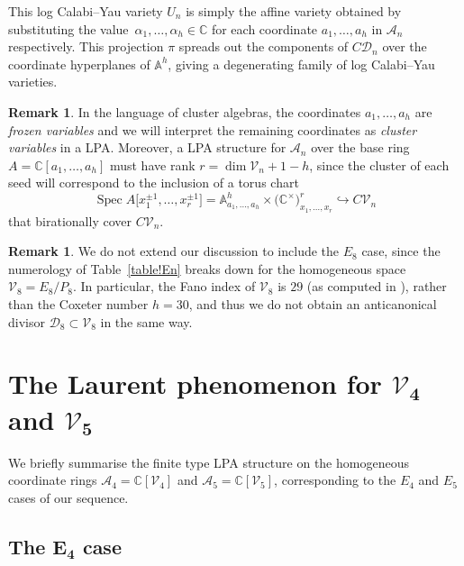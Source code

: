 \documentclass[10pt,a4paper]{amsart}
\numberwithin{equation}{section}
\theoremstyle{definition}
\newtheorem{rmk}[thm]{Remark}
\newcommand{\Aa}{\mathbb{A}}
\newcommand{\CC}{\mathbb{C}}
\DeclareMathOperator{\Spec}{Spec}
\begin{document}
This log Calabi--Yau variety $U_n$ is simply the affine variety obtained by substituting the value~${\alpha_1,\ldots,\alpha_h\in \CC}$ for each coordinate $a_1,\ldots,a_h$ in $\mathcal A_n$ respectively.
This projection $\pi$ spreads out the components of $C\mathcal D_n$ over the coordinate hyperplanes of $\Aa^h$, giving a degenerating family of log Calabi--Yau varieties.

\begin{rmk}\label{rmk!seed-rank}In the language of cluster algebras, the coordinates $a_1,\ldots,a_h$ are \emph{frozen variables} and we will interpret the remaining coordinates as \emph{cluster variables} in a LPA. Moreover, a LPA structure for $\mathcal A_n$ over the base ring $A=\CC[a_1,\ldots,a_h]$ must have rank $r = \dim \mathcal V_n + 1 - h$, since the cluster of each seed will correspond to the inclusion of a torus chart
\[ \Spec A\big[x_1^{\pm1},\ldots,x_r^{\pm1}\big] = \Aa^h_{a_1,\ldots,a_h}\times \big(\CC^\times\big)^r_{x_1,\ldots,x_r} \hookrightarrow C\mathcal V_n \]
that birationally cover $C\mathcal V_n$.
\end{rmk}

\begin{rmk}We do not extend our discussion to include the $E_8$ case, since the numerology of Table~\ref{table!En} breaks down for the homogeneous space $\mathcal V_8=E_8/P_8$. In particular, the Fano index of $\mathcal V_8$ is $29$ (as computed in \cite{snow}), rather than the Coxeter number $h=30$, and thus we do not obtain an anticanonical divisor $\mathcal D_8\subset \mathcal V_8$ in the same way.
\end{rmk}

\section[The Laurent phenomenon for V\_4 and V\_5]{The Laurent phenomenon for $\boldsymbol{\mathcal V_4}$ and $\boldsymbol{\mathcal V_5}$}
\label{section:warm-up-cases}

We briefly summarise the finite type LPA structure on the homogeneous coordinate rings ${\mathcal A_4 = \CC[\mathcal V_4]}$ and $\mathcal A_5 = \CC[\mathcal V_5]$, corresponding to the $E_4$ and $E_5$ cases of our sequence.

\subsection[The E\_4 case]{The $\boldsymbol{E_4}$ case}
\end{document}
